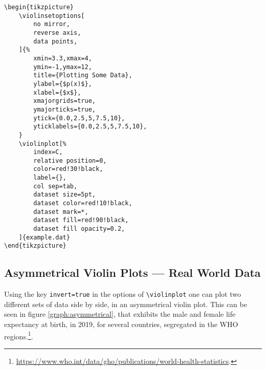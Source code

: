 \documentclass{article}
\begin{document}

\begin{verbatim}
\begin{tikzpicture}
	\violinsetoptions[
		no mirror,
		reverse axis,
		data points,
	]{%
		xmin=3.3,xmax=4,
		ymin=-1,ymax=12,
		title={Plotting Some Data},
		ylabel={$p(x)$},
		xlabel={$x$},
		xmajorgrids=true,
		ymajorticks=true,
		ytick={0.0,2.5,5,7.5,10},
		yticklabels={0.0,2.5,5,7.5,10},
	}
	\violinplot[%
		index=C,
		relative position=0,
		color=red!30!black,
		label={},
		col sep=tab,
		dataset size=5pt,
		dataset color=red!10!black,
		dataset mark=*,
		dataset fill=red!90!black,
		dataset fill opacity=0.2,
	]{example.dat}
\end{tikzpicture}
\end{verbatim}

\subsection{Asymmetrical Violin Plots --- Real World Data}

Using the key \texttt{invert=true} in the options of
\texttt{\textbackslash violinplot} one can plot two different sets of data side
by side, in an asymmetrical violin plot. This can be seen in figure
\ref{graph:asymmetrical}, that exhibits the male and female life expectancy at
birth, in 2019, for several countries, segregated in the WHO regions.\footnote{
	\url{https://www.who.int/data/gho/publications/world-health-statistics}.
}.

\end{document}
